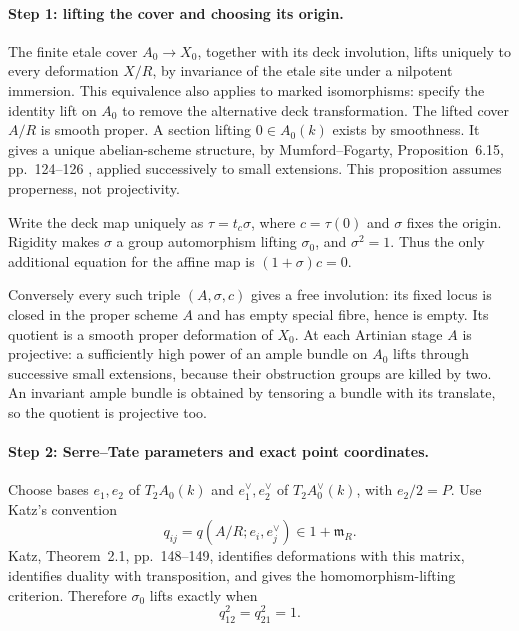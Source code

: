 \paragraph{Step 1: lifting the cover and choosing its origin.}
The finite etale cover $A_0\to X_0$, together with its deck involution,
lifts uniquely to every deformation $X/R$, by invariance of the etale site
under a nilpotent immersion. This equivalence also applies to marked
isomorphisms: specify the identity lift on $A_0$ to remove the alternative
deck transformation. The lifted cover $A/R$ is smooth proper. A section
lifting $0\in A_0(k)$ exists by smoothness. It gives a unique abelian-scheme
structure, by Mumford--Fogarty, Proposition~6.15, pp.~124--126
\cite{DGJ_MumfordFogarty1982}, applied successively to small extensions.
This proposition assumes properness, not projectivity.

Write the deck map uniquely as $\tau=t_c\sigma$, where
$c=\tau(0)$ and $\sigma$ fixes the origin. Rigidity makes $\sigma$ a group
automorphism lifting $\sigma_0$, and $\sigma^2=1$. Thus the only additional
equation for the affine map is $(1+\sigma)c=0$.

Conversely every such triple $(A,\sigma,c)$ gives a free involution: its
fixed locus is closed in the proper scheme $A$ and has empty special
fibre, hence is empty. Its quotient is a smooth proper deformation of
$X_0$. At each Artinian stage $A$ is projective: a sufficiently high
power of an ample bundle on $A_0$ lifts through successive small
extensions, because their obstruction groups are killed by two.
An invariant ample bundle is obtained by tensoring a bundle with its
translate, so the quotient is projective too.

\paragraph{Step 2: Serre--Tate parameters and exact point coordinates.}
Choose bases $e_1,e_2$ of $T_2A_0(k)$ and $e_1^\vee,e_2^\vee$ of
$T_2A_0^\vee(k)$, with $e_2/2=P$. Use Katz's convention
\[
 q_{ij}=q(A/R;e_i,e_j^\vee)\in1+\mathfrak m_R.
\]
Katz, Theorem~2.1, pp.~148--149, identifies deformations with this matrix,
identifies duality with transposition, and gives the homomorphism-lifting
criterion. Therefore $\sigma_0$ lifts exactly when
\[
 q_{12}^2=q_{21}^2=1.                                      \tag{I1}
\]

